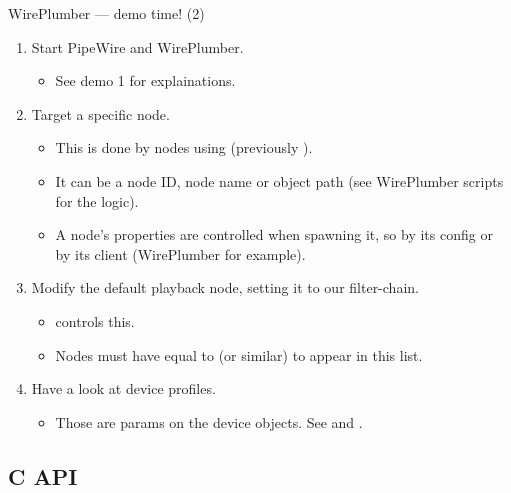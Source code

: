 \begin{frame}{WirePlumber — demo time! (2)}
  \begin{enumerate}

  \item Start PipeWire and WirePlumber.

    \begin{itemize}
    \item See demo 1 for explainations.
    \end{itemize}

  \item Target a specific node.

    \begin{itemize}
    \item This is done by nodes using  (previously
      ).
    \item It can be a node ID, node name or object path (see
      WirePlumber scripts for the logic).
    \item A node's properties are controlled when spawning it, so by
      its config or by its client (WirePlumber for example).
    \end{itemize}

  \item Modify the default playback node, setting it to our filter-chain.

    \begin{itemize}
    \item {} controls this.
    \item Nodes must have  equal to 
      (or similar) to appear in this list.
    \end{itemize}

  \item Have a look at device profiles.

    \begin{itemize}
    \item Those are params on the device objects. See 
      and .
    \end{itemize}

  \end{enumerate}
\end{frame}



\subsection{C API}



